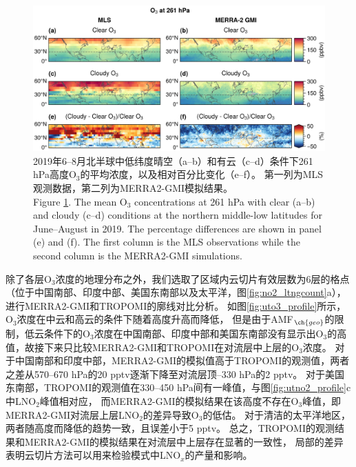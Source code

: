 \begin{figure}[H]
    \centering
    \includegraphics[width=\textwidth]{./figures/mls_o3_261hpa.png}
    \caption{
    2019年6--8月北半球中低纬度晴空（a--b）和有云（c--d）条件下261 hPa高度O$_3$的平均浓度，以及相对百分比变化（e--f）。
    第一列为MLS观测数据，第二列为MERRA2-GMI模拟结果。 \\
    Figure \ref{fig:mls_o3_261hpa}. The mean O$_3$ concentrations at 261 hPa with clear (a--b) and cloudy (c--d) conditions at the northern middle-low latitudes for June--August in 2019. The percentage differences are shown in panel (e) and (f).
    The first column is the MLS observations while the second column is the MERRA2-GMI simulations.
    }
    \label{fig:mls_o3_261hpa}
\end{figure}


除了各层O$_3$浓度的地理分布之外，我们选取了区域内云切片有效层数为6层的格点（位于中国南部、印度中部、美国东南部以及太平洋，图\ref{fig:no2_ltngcount}a），
进行MERRA2-GMI和TROPOMI的廓线对比分析。
如图\ref{fig:uto3_profile}所示，O$_3$浓度在中云和高云的条件下随着高度升高而降低，
但是由于AMF$_{\ch{geo}}$的限制，低云条件下的O$_3$浓度在中国南部、印度中部和美国东南部没有显示出O$_3$的高值，故接下来只比较MERRA2-GMI和TROPOMI在对流层中上层的O$_3$浓度。
对于中国南部和印度中部，MERRA2-GMI的模拟值高于TROPOMI的观测值，两者之差从570--670 hPa的20 pptv逐渐下降至对流层顶--330 hPa的2 pptv。
对于美国东南部，TROPOMI的观测值在330--450 hPa间有一峰值，与图\ref{fig:utno2_profile}c中LNO$_2$峰值相对应，
而MERRA2-GMI的模拟结果在该高度不存在O$_3$峰值，即MERRA2-GMI对流层上层LNO$_2$的差异导致O$_3$的低估。
对于清洁的太平洋地区，两者随高度而降低的趋势一致，且误差小于5 pptv。
总之，TROPOMI的观测结果和MERRA2-GMI的模拟结果在对流层中上层存在显著的一致性，
局部的差异表明云切片方法可以用来检验模式中LNO$_x$的产量和影响。


